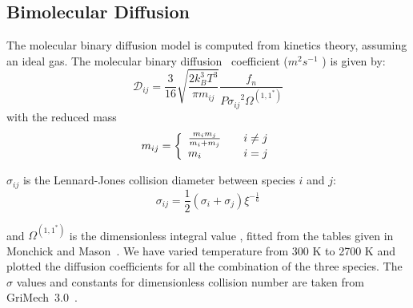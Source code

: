 \subsection{Bimolecular Diffusion}
 The molecular binary diffusion model is
computed from kinetics theory, assuming an ideal gas. The molecular binary diffusion~\cite{Curtiss} coefficient ($m^2 s^{-1}$ ) is given by:
%
\begin{equation}
  \mathcal{D}_{ij} = \frac{3}{16}\sqrt{\frac{2 k_B^3 T^3}{\pi m_{ij}}}\frac{f_n}{{ P \sigma_{ij}}^2   \Omega^{(1,1^*)}}
\end{equation}
with  the reduced mass
\begin{equation}
m_{ij} = \left\{\begin{array}{l@{\qquad}l}
                \frac{m_i m_j}{m_i + m_j} &  i \neq j \\
                m_i                                  & i=j
                    \end{array}
              \right.
\end{equation}

$\sigma_{ij}$ is the Lennard-Jones collision diameter between species $i$ and $j$:
\begin{equation}
\sigma_{ij} = \frac{1}{2}\left(\sigma_i + \sigma_j\right) \xi^{-\frac{1}{6}}
\end{equation}

 and $\Omega^{(1,1^*)}$ is the dimensionless integral value ,
fitted from the tables given in Monchick and Mason~\cite{Monchick}. We
have varied temperature from 300 K to 2700 K and plotted the diffusion
coefficients for all the combination of the three species.
The $\sigma$ values and constants for dimensionless collision number
are taken from GriMech~3.0~\cite{gri}.


